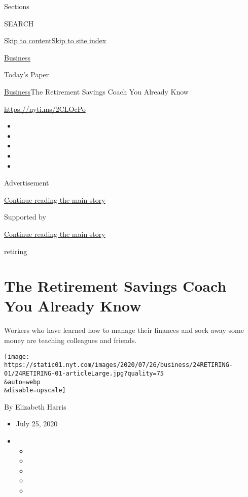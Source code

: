 Sections

SEARCH

\protect\hyperlink{site-content}{Skip to
content}\protect\hyperlink{site-index}{Skip to site index}

\href{https://www.nytimes.com/section/business}{Business}

\href{https://myaccount.nytimes.com/auth/login?response_type=cookie\&client_id=vi}{}

\href{https://www.nytimes.com/section/todayspaper}{Today's Paper}

\href{/section/business}{Business}\textbar{}The Retirement Savings Coach
You Already Know

\url{https://nyti.ms/2CLOcPo}

\begin{itemize}
\item
\item
\item
\item
\item
\end{itemize}

Advertisement

\protect\hyperlink{after-top}{Continue reading the main story}

Supported by

\protect\hyperlink{after-sponsor}{Continue reading the main story}

retiring

\hypertarget{the-retirement-savings-coach-you-already-know}{%
\section{The Retirement Savings Coach You Already
Know}\label{the-retirement-savings-coach-you-already-know}}

Workers who have learned how to manage their finances and sock away some
money are teaching colleagues and friends.

\texttt{[image: https://static01.nyt.com/images/2020/07/26/business/24RETIRING-01/24RETIRING-01-articleLarge.jpg?quality=75\\\&auto=webp\\\&disable=upscale]}

By Elizabeth Harris

\begin{itemize}
\item
  July 25, 2020
\item
  \begin{itemize}
  \item
  \item
  \item
  \item
  \item
  \end{itemize}
\end{itemize}

